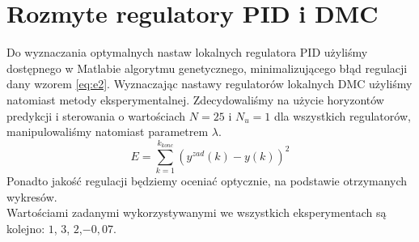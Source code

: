 \chapter{Rozmyte regulatory PID i DMC}
Do wyznaczania optymalnych nastaw lokalnych regulatora PID użyliśmy dostępnego w Matlabie algorytmu genetycznego, minimalizującego błąd regulacji dany wzorem \ref{eq:e2}. Wyznaczając nastawy regulatorów lokalnych DMC użyliśmy natomiast metody eksperymentalnej. Zdecydowaliśmy na użycie horyzontów predykcji i sterowania o wartościach $N=25$ i $N_u=1$ dla wszystkich regulatorów, manipulowaliśmy natomiast parametrem $\lambda$.
\begin{equation} \label{eq:e2}
E = \sum_{k=1}^{k_{konc}} (y^{zad}(k)-y(k))^2
\end{equation}
Ponadto jakość regulacji będziemy oceniać optycznie, na podstawie otrzymanych wykresów. \\
Wartościami zadanymi wykorzystywanymi we wszystkich eksperymentach są kolejno: $1$, $3$, $2$,$-0,07$.





